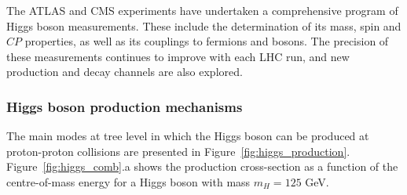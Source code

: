 The ATLAS and CMS experiments have undertaken a comprehensive program of Higgs boson measurements. These include the determination of its mass, spin and $CP$ properties, as well as its couplings to fermions and bosons. The precision of these measurements continues to improve with each LHC run, and new production and decay channels are also explored.

\subsubsection*{Higgs boson production mechanisms}
\label{sec:higgs_production}
The main modes at tree level in which the Higgs boson can be produced at proton-proton collisions are presented in Figure~\ref{fig:higgs_production}. Figure~\ref{fig:higgs_comb}.a shows the production cross-section as a function of the centre-of-mass energy for a Higgs boson with mass $m_{H}=125$ GeV.

